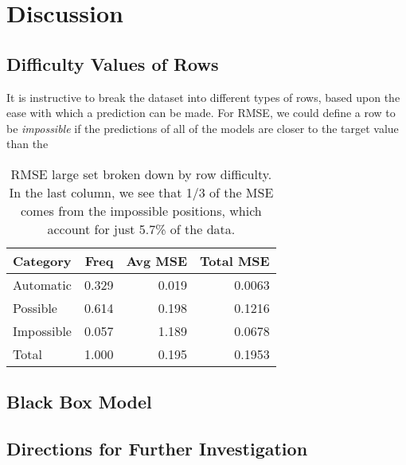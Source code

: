 \documentclass{article}
\begin{document}
\section{Discussion}

\subsection{Difficulty Values of Rows}

It is instructive to break the dataset into different types of rows, based upon the ease with which a prediction can be made.  For RMSE, we could define a row to be \emph{impossible} if the predictions of all of the models are closer to the target value than the

\begin{table}[t]
\caption{RMSE large set broken down by row difficulty.  In the last column, we see that 1/3 of the MSE comes from the impossible positions, which account for just 5.7\% of the data.}
\label{rowtypesrmse}
\vskip 0.15in
\begin{center}
\begin{small}
\begin{sc}
\begin{tabular}{lrrr}
\hline
\abovespace\belowspace
Category & Freq & Avg MSE & Total MSE \\
\hline
\abovespace
Automatic     & 0.329 & 0.019 & 0.0063 \\
Possible      & 0.614 & 0.198 & 0.1216 \\
\belowspace
Impossible    & 0.057 & 1.189 & 0.0678 \\
\hline
Total         & 1.000 & 0.195 & 0.1953 \\
\hline
\end{tabular}
\end{sc}
\end{small}
\end{center}
\vskip -0.1in
\end{table}




\subsection{Black Box Model}


\subsection{}


\subsection{Directions for Further Investigation}
\end{document}
